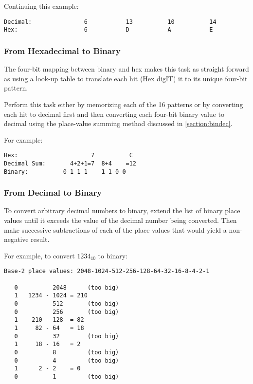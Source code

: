 Continuing this example:

\begin{verbatim}
Decimal:               6           13          10          14
Hex:                   6           D           A           E
\end{verbatim}



\subsubsection{From Hexadecimal to Binary}

The four-bit mapping between binary and hex makes this
task as straight forward as using a look-up table to 
translate each \gls{hit} (Hex digIT) it to its unique 
four-bit pattern.

Perform this task either by memorizing each of the 16 patterns 
or by converting each hit to decimal first and then converting
each four-bit binary value to decimal using the place-value summing 
method discussed in \autoref{section:bindec}.

For example:

\begin{verbatim}
Hex:                     7          C
Decimal Sum:       4+2+1=7  8+4    =12
Binary:          0 1 1 1    1 1 0 0
\end{verbatim}


\subsubsection{From Decimal to Binary}

To convert arbitrary decimal numbers to binary, extend the list 
of binary place values until it exceeds the value of the decimal 
number being converted.  Then make successive subtractions of each 
of the place values that would yield a non-negative result.

For example, to convert $1234_{10}$ to binary:


\begin{verbatim}
Base-2 place values: 2048-1024-512-256-128-64-32-16-8-4-2-1

   0          2048      (too big)
   1   1234 - 1024 = 210
   0          512       (too big)
   0          256       (too big)
   1    210 - 128  = 82
   1     82 - 64   = 18
   0          32        (too big)
   1     18 - 16   = 2
   0          8         (too big)
   0          4         (too big)
   1      2 - 2    = 0
   0          1         (too big)
\end{verbatim}

